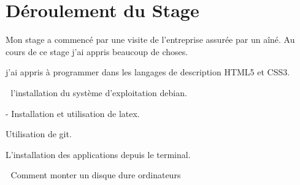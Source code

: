 \section{Déroulement du Stage}

Mon stage a commencé par une visite de l’entreprise assurée par un aîné. 
Au cours de ce stage j'ai appris beaucoup de choses.


j'ai appris à programmer dans les langages de description HTML5 et CSS3.

 l’installation du système d’exploitation debian.

- Installation et utilisation de latex.

Utilisation de git.

L'installation des applications depuis le terminal.

 Comment monter un disque dure ordinateurs 
